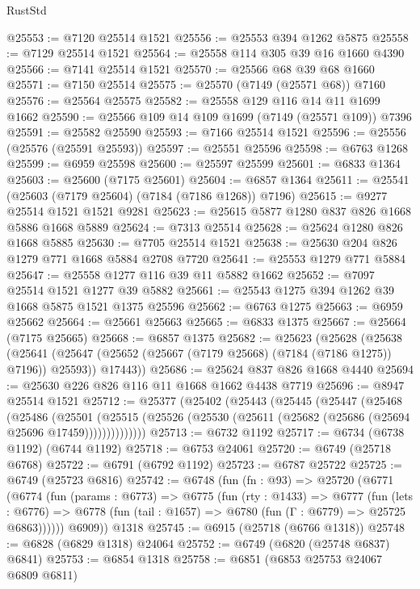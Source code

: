 \begin{lexlean}{RustStd}
\begin{coremodule}
@25553 := @7120 @25514 @1521
@25556 := @25553 @394 @1262 @5875
@25558 := @7129 @25514 @1521
@25564 := @25558 @114 @305 @39 @16 @1660 @4390
@25566 := @7141 @25514 @1521
@25570 := @25566 @68 @39 @68 @1660
@25571 := @7150 @25514
@25575 := @25570 (@7149 (@25571 @68)) @7160
@25576 := @25564 @25575
@25582 := @25558 @129 @116 @14 @11 @1699 @1662
@25590 := @25566 @109 @14 @109 @1699 (@7149 (@25571 @109)) @7396
@25591 := @25582 @25590
@25593 := @7166 @25514 @1521
@25596 := @25556 (@25576 (@25591 @25593))
@25597 := @25551 @25596
@25598 := @6763 @1268
@25599 := @6959 @25598
@25600 := @25597 @25599
@25601 := @6833 @1364
@25603 := @25600 (@7175 @25601)
@25604 := @6857 @1364
@25611 := @25541 (@25603 (@7179 @25604) (@7184 (@7186 @1268)) @7196)
@25615 := @9277 @25514 @1521 @1521 @9281
@25623 := @25615 @5877 @1280 @837 @826 @1668 @5886 @1668 @5889
@25624 := @7313 @25514
@25628 := @25624 @1280 @826 @1668 @5885
@25630 := @7705 @25514 @1521
@25638 := @25630 @204 @826 @1279 @771 @1668 @5884 @2708 @7720
@25641 := @25553 @1279 @771 @5884
@25647 := @25558 @1277 @116 @39 @11 @5882 @1662
@25652 := @7097 @25514 @1521 @1277 @39 @5882
@25661 := @25543 @1275 @394 @1262 @39 @1668 @5875 @1521 @1375 @25596
@25662 := @6763 @1275
@25663 := @6959 @25662
@25664 := @25661 @25663
@25665 := @6833 @1375
@25667 := @25664 (@7175 @25665)
@25668 := @6857 @1375
@25682 := @25623
    (@25628
      (@25638
        (@25641 (@25647 (@25652 (@25667 (@7179 @25668) (@7184 (@7186 @1275)) @7196)) @25593))
        @17443))
@25686 := @25624 @837 @826 @1668 @4440
@25694 := @25630 @226 @826 @116 @11 @1668 @1662 @4438 @7719
@25696 := @8947 @25514 @1521
@25712 := @25377
    (@25402
      (@25443
        (@25445
          (@25447
            (@25468
              (@25486
                (@25501
                  (@25515
                    (@25526 (@25530 (@25611 (@25682 (@25686 (@25694 @25696 @17459))))))))))))))
@25713 := @6732 @1192
@25717 := @6734 (@6738 @1192) (@6744 @1192)
@25718 := @6753 @24061
@25720 := @6749 (@25718 @6768)
@25722 := @6791 (@6792 @1192)
@25723 := @6787 @25722
@25725 := @6749 (@25723 @6816)
@25742 := @6748
    (fun (fn : @93) =>
    @25720
      (@6771
        (@6774
          (fun (params : @6773) =>
          @6775
            (fun (rty : @1433) =>
            @6777
              (fun (lets : @6776) =>
              @6778 (fun (tail : @1657) => @6780 (fun (Γ : @6779) => @25725 @6863))))))
        @6909))
    @1318
@25745 := @6915 (@25718 (@6766 @1318))
@25748 := @6828 (@6829 @1318) @24064
@25752 := @6749 (@6820 (@25748 @6837) @6841)
@25753 := @6854 @1318
@25758 := @6851 (@6853 @25753 @24067 @6809 @6811)

\end{coremodule}
\end{lexlean}
